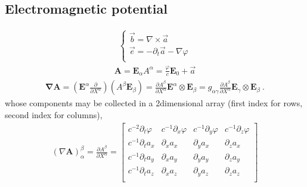 \documentclass[letterpaper,10pt,english]{jupyterBook}
\begin{document}
\subsection{Electromagnetic potential}
\label{\detokenize{ch/relativity-special/notes:electromagnetic-potential}}\begin{equation*}
\begin{split}\begin{cases}
 \vec{b} = \nabla \times \vec{a} \\
 \vec{e} = -\partial_t \vec{a} - \nabla \varphi \\
\end{cases}\end{split}
\end{equation*}\begin{equation*}
\begin{split}\mathbf{A} = \mathbf{E}_{\alpha} A^{\alpha} = \frac{\varphi}{c} \mathbf{E}_0 + \vec{a}\end{split}
\end{equation*}\begin{equation*}
\begin{split}\symbf{\nabla} \mathbf{A} =
\left( \mathbf{E}^{\alpha} \frac{\partial}{\partial X^{\alpha}} \right) \left( A^{\beta} \mathbf{E}_{\beta} \right)
= \frac{\partial A^{\beta}}{\partial X^{\alpha}} \mathbf{E}^{\alpha} \otimes \mathbf{E}_{\beta} 
= g_{\alpha \gamma} \frac{\partial A^{\beta}}{\partial X^{\alpha}} \mathbf{E}_{\gamma} \otimes \mathbf{E}_{\beta}  \ .\end{split}
\end{equation*}
\sphinxAtStartPar
whose components may be collected in a 2\sphinxhyphen{}dimensional array (first index for rows, second index for columns),
\begin{equation*}
\begin{split}(\nabla \mathbf{A})_{\alpha}^{\beta} = \frac{\partial A^{\beta}}{\partial X^{\alpha}} =
\begin{bmatrix}
 c^{-2} \partial_t \varphi & c^{-1}\partial_x \varphi & c^{-1}\partial_y \varphi & c^{-1}\partial_z \varphi \\
 c^{-1} \partial_t a_x     &       \partial_x a_x     &       \partial_y a_x     &       \partial_z a_x     \\
 c^{-1} \partial_t a_y     &       \partial_x a_y     &       \partial_y a_y     &       \partial_z a_y     \\
 c^{-1} \partial_t a_z     &       \partial_x a_z     &       \partial_y a_z     &       \partial_z a_z     \\
\end{bmatrix}\end{split}
\end{equation*}
\end{document}
